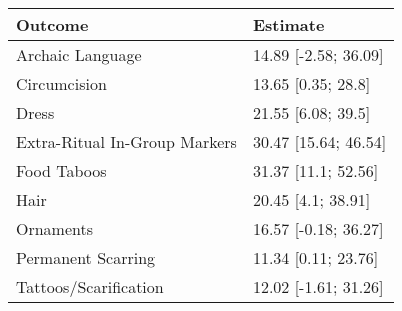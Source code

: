 \begin{tabular}{ll}
\toprule
Outcome & Estimate \\
\midrule
Archaic Language & 14.89 [-2.58; 36.09] \\
Circumcision & 13.65 [0.35; 28.8] \\
Dress & 21.55 [6.08; 39.5] \\
Extra-Ritual In-Group Markers & 30.47 [15.64; 46.54] \\
Food Taboos & 31.37 [11.1; 52.56] \\
Hair & 20.45 [4.1; 38.91] \\
Ornaments & 16.57 [-0.18; 36.27] \\
Permanent Scarring & 11.34 [0.11; 23.76] \\
Tattoos/Scarification & 12.02 [-1.61; 31.26] \\
\bottomrule
\end{tabular}
